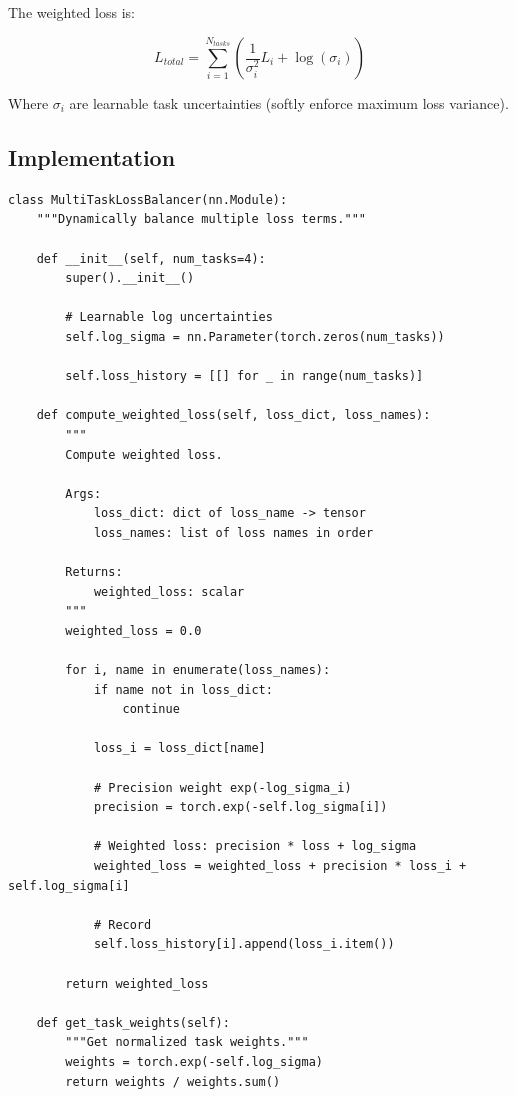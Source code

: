 \documentclass[12pt,a4paper,oneside]{report}
\begin{document}
The weighted loss is:

\begin{equation}
L_{total} = \sum_{i=1}^{N_{tasks}} \left(\frac{1}{\sigma_i^2} L_i + \log(\sigma_i)\right)
\label{eq:multitask_loss}
\end{equation}

Where $\sigma_i$ are learnable task uncertainties (softly enforce maximum loss variance).

\subsection{Implementation}

\begin{lstlisting}
class MultiTaskLossBalancer(nn.Module):
    """Dynamically balance multiple loss terms."""

    def __init__(self, num_tasks=4):
        super().__init__()

        # Learnable log uncertainties
        self.log_sigma = nn.Parameter(torch.zeros(num_tasks))

        self.loss_history = [[] for _ in range(num_tasks)]

    def compute_weighted_loss(self, loss_dict, loss_names):
        """
        Compute weighted loss.

        Args:
            loss_dict: dict of loss_name -> tensor
            loss_names: list of loss names in order

        Returns:
            weighted_loss: scalar
        """
        weighted_loss = 0.0

        for i, name in enumerate(loss_names):
            if name not in loss_dict:
                continue

            loss_i = loss_dict[name]

            # Precision weight exp(-log_sigma_i)
            precision = torch.exp(-self.log_sigma[i])

            # Weighted loss: precision * loss + log_sigma
            weighted_loss = weighted_loss + precision * loss_i + self.log_sigma[i]

            # Record
            self.loss_history[i].append(loss_i.item())

        return weighted_loss

    def get_task_weights(self):
        """Get normalized task weights."""
        weights = torch.exp(-self.log_sigma)
        return weights / weights.sum()
\end{lstlisting}
\end{document}
